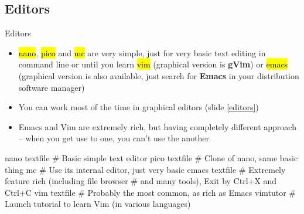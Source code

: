 \documentclass[compress, ucs, xelatex, 11pt, xcolor=svgnames,
  hyperref={
    bookmarks=true,
    unicode=true,
    colorlinks=true,
    pdftitle={Linux, command line and MetaCentrum},
    plainpages=false,
    pdfauthor={Vojtech Zeisek},
    pdfsubject={Course about use of Linux command line, writing shell scripts and using MetaCentrum of CESNET},
    pdfcreator={XeLaTeX},
    pdfkeywords={Linux, GNU, BASH, shell, command line, MetaCentrum},
    linkcolor=DarkRed,
    anchorcolor=DarkBlue,
    citecolor=Indigo,
    filecolor=NavyBlue,
    menucolor=DarkMagenta,
    urlcolor=DarkBlue,
    pdftex},
  url={hyphens, lowtilde} %
  ]{beamer}
\renewcommand{\texttt}[1]{\hl{\ttfamily #1}}
\begin{document}
\subsection{Editors} 

\begin{frame}[fragile]{Editors}
\begin{itemize}
 \item \texttt{nano}, \texttt{pico} and \texttt{mc} are very simple, just for very basic text editing in command line or until you learn \texttt{vim} (graphical version is \textbf{gVim}) or \texttt{emacs} (graphical version is also available, just search for \textbf{Emacs} in your distribution software manager)
 \item You can work most of the time in graphical editors (slide \ref{editors})
 \item Emacs and Vim are extremely rich, but having completely different approach -- when you get use to one, you can't use the another
\end{itemize}
  \begin{bashcode}
    nano textfile # Basic simple text editor
    pico textfile # Clone of nano, same basic thing
    mc # Use its internal editor, just very basic
    emacs textfile # Extremely feature rich (including file browser
                   # and many tools), Exit by Ctrl+X and Ctrl+C
    vim textfile # Probably the most common, as rich as Emacs
    vimtutor # Launch tutorial to learn Vim (in various languages)
   \end{bashcode}
\end{frame}
\end{document}
